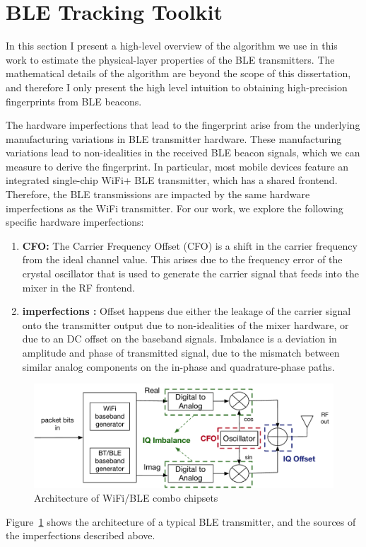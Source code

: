 
\section{BLE Tracking Toolkit}
\label{sec:methodology}

In this section I present a high-level overview of the algorithm we use in this work to estimate the physical-layer properties of the BLE transmitters.
%
The mathematical details of the algorithm are beyond the scope of this dissertation, and therefore I only present the high level intuition to obtaining high-precision fingerprints from BLE beacons.

The hardware imperfections that lead to the fingerprint arise from the underlying manufacturing variations in BLE transmitter hardware.
%
These manufacturing variations lead to non-idealities in the received BLE beacon signals, which we can measure to derive the fingerprint.
%
In particular, most mobile devices feature an integrated single-chip WiFi+ BLE transmitter, which has a shared \iq frontend.
%
Therefore, the BLE transmissions are impacted by the same hardware imperfections as the WiFi transmitter.
%
For our work, we explore the following specific hardware imperfections:
\begin{enumerate}
    \item \textbf{CFO: } The Carrier Frequency Offset (CFO) is a shift in the carrier frequency from the ideal channel value. This arises due to the frequency error of the crystal oscillator that is used to generate the carrier signal that feeds into the mixer in the RF frontend.
    \item \textbf{\iq imperfections :} \iq Offset happens due either the leakage of the carrier signal onto the transmitter output due to non-idealities of the mixer hardware, or due to an DC offset on the baseband signals. \iq Imbalance is a deviation in amplitude and phase of transmitted signal, due to the mismatch between similar analog components on the in-phase and quadrature-phase paths.
    
\end{enumerate}
\begin{figure}
    \centering
    \captionsetup{justification=centering}
    \includegraphics[width = 0.8\linewidth]{bletracking/plots/IQchain.pdf} 
    \caption{Architecture of WiFi/BLE combo chipsets}
    \label{fig:iq_arch}
\end{figure}
Figure~\ref{fig:iq_arch} shows the architecture of a typical BLE transmitter, and the sources of the imperfections described above.

